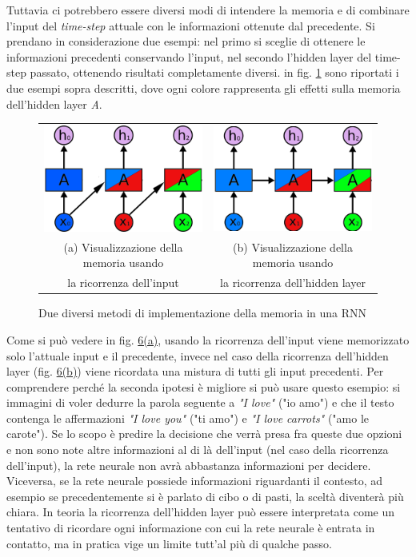 Tuttavia ci potrebbero essere diversi modi di intendere la memoria e di combinare l'input del \textit{time-step} attuale con le informazioni ottenute dal precedente. Si prendano in considerazione due esempi: nel primo si sceglie di ottenere le informazioni precedenti conservando l'input, nel secondo l'hidden layer del time-step passato, ottenendo risultati completamente diversi. in fig. \ref{fig:1.6} sono riportati i due esempi sopra descritti, dove ogni colore rappresenta gli effetti sulla memoria dell'hidden layer \textit{A}.
\begin{figure}[ht]
	\centering
	\begin{tabular}{cc}
		\includegraphics[width=0.4\linewidth]{img/input_memory.png} &
		\includegraphics[width=0.4\linewidth]{img/hidden_memory.png} \\
		\footnotesize (a) Visualizzazione della memoria usando & \footnotesize (b) Visualizzazione della memoria usando \\ \footnotesize la ricorrenza dell'input & \footnotesize la ricorrenza dell'hidden layer
	\end{tabular}
	\caption{Due diversi metodi di implementazione della memoria in una RNN}
	\label{fig:1.6}
\end{figure}

Come si può vedere in fig. \hyperref[fig:1.6]{6(a)}, usando la ricorrenza dell'input viene memorizzato solo l'attuale input e il precedente, invece nel caso della ricorrenza dell'hidden layer (fig. \hyperref[fig:1.6]{6(b)}) viene ricordata una mistura di tutti gli input precedenti. Per comprendere perché la seconda ipotesi è migliore si può usare questo esempio: si immagini di voler dedurre la parola seguente a \textit{"I love"} ("io amo") e che il testo contenga le affermazioni \textit{"I love you"} ("ti amo") e \textit{"I love carrots"} ("amo le carote"). Se lo scopo è predire la decisione che verrà presa fra queste due opzioni e non sono note altre informazioni al di là dell'input (nel caso della ricorrenza dell'input), la rete neurale non avrà abbastanza informazioni per decidere. Viceversa, se la rete neurale possiede informazioni riguardanti il contesto, ad esempio se precedentemente si è parlato di cibo o di pasti, la sceltà diventerà più chiara. In teoria la ricorrenza dell'hidden layer può essere interpretata come un tentativo di ricordare ogni informazione con cui la rete neurale è entrata in contatto, ma in pratica vige un limite tutt'al più di qualche passo.

